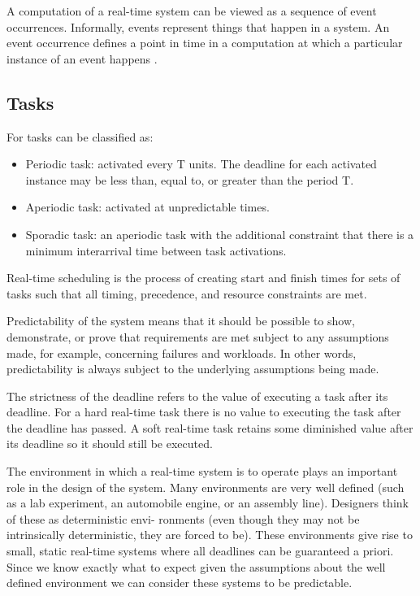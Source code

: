 \documentclass[12pt]{article}
\begin{document}
A computation of a real-time system can be viewed as a sequence of event occurrences. Informally, 
events represent things that happen in a system. An event occurrence defines a point in time in a
computation at which a particular instance of an event happens \cite{chodrow1991run}.

\subsection{Tasks}

For \cite{stankovic1996real} tasks can be classified as:

\begin{itemize}
  \item Periodic task: activated every T units. The deadline for each activated instance may be less than, equal to, 
or greater than the period T.
  \item Aperiodic task: activated at unpredictable times.
  \item Sporadic task: an aperiodic task with the additional constraint that there is a minimum interarrival time 
between task activations.
\end{itemize}

Real-time scheduling is the process of creating start and finish times for sets of tasks such that
all timing, precedence, and resource constraints are met.

\iffalse

Predictability of the system means that it should be possible to show, demonstrate, or prove that requirements are
met subject to any assumptions made, for example, concerning failures and workloads. In other words, 
predictability is always subject to the underlying assumptions being made.

The strictness of the deadline refers to the value of executing a task after its deadline. For a hard real-time 
task there is no value to executing the task after the deadline has passed. A soft real-time task retains some 
diminished value after its deadline so it should still be executed.

The environment in which a real-time system is to operate plays an important role in the
design of the system. Many environments are very well defined (such as a lab experiment,
an automobile engine, or an assembly line). Designers think of these as deterministic envi-
ronments (even though they may not be intrinsically deterministic, they are forced to be).
These environments give rise to small, static real-time systems where all deadlines can
be guaranteed a priori. Since we know exactly what to expect given the assumptions about the 
well defined environment we can consider these systems to be predictable.
\end{document}
